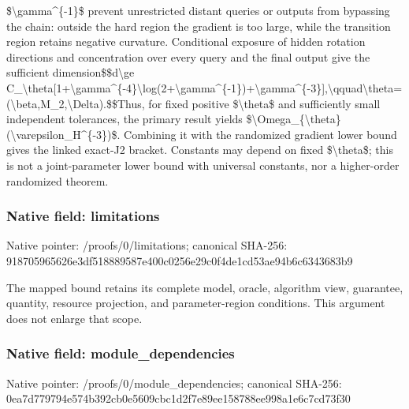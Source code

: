 \documentclass[10pt,a4paper]{article}
\begin{document}
\$\textbackslash{}gamma\textasciicircum{}\{-1\}\$ prevent unrestricted distant queries or outputs from bypassing the chain:\allowbreak{} outside the hard region the gradient is too large,\allowbreak{} while the transition region retains negative curvature. Conditional exposure of hidden rotation directions and concentration over every query and the final output give the sufficient dimension\newline{}\$\$d\textbackslash{}ge C\_\allowbreak{}\textbackslash{}theta[1+\textbackslash{}gamma\textasciicircum{}\{-4\}\textbackslash{}log(2+\textbackslash{}gamma\textasciicircum{}\{-1\})+\textbackslash{}gamma\textasciicircum{}\{-3\}],\allowbreak{}\textbackslash{}qquad\textbackslash{}theta=\allowbreak{}(\textbackslash{}beta,\allowbreak{}M\_\allowbreak{}2,\allowbreak{}\textbackslash{}Delta).\$\$\newline{}Thus,\allowbreak{} for fixed positive \$\textbackslash{}theta\$ and sufficiently small independent tolerances,\allowbreak{} the primary result yields \$\textbackslash{}Omega\_\allowbreak{}\{\textbackslash{}theta\}(\textbackslash{}varepsilon\_\allowbreak{}H\textasciicircum{}\{-3\})\$. Combining it with the randomized gradient lower bound gives the linked exact-J2 bracket. Constants may depend on fixed \$\textbackslash{}theta\$;\allowbreak{} this is not a joint-parameter lower bound with universal constants,\allowbreak{} nor a higher-order randomized theorem.\par\endgroup

\subsubsection{Native field: limitations}
Native pointer: /proofs/0/limitations; canonical SHA-256: 918705965626e3df518889587e400c0256e29c0f4de1cd53ae94b6c6343683b9

\begingroup\raggedright\sloppy The mapped bound retains its complete model,\allowbreak{} oracle,\allowbreak{} algorithm view,\allowbreak{} guarantee,\allowbreak{} quantity,\allowbreak{} resource projection,\allowbreak{} and parameter-region conditions. This argument does not enlarge that scope.\par\endgroup

\subsubsection{Native field: module\_\allowbreak{}dependencies}
Native pointer: /proofs/0/module\_\allowbreak{}dependencies; canonical SHA-256: 0ea7d779794e574b392cb0e5609cbc1d2f7e89ee158788ee998a1e6c7cd73f30
\end{document}

